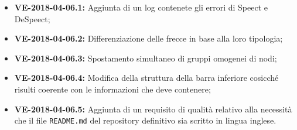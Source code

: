 \documentclass[openany,12pt,a4paper]{article}
\begin{document}
  \begin{itemize} 
      \item \textbf{VE-2018-04-06.1:} Aggiunta di un log contenete gli errori di Speect e DeSpeect; 
      \item \textbf{VE-2018-04-06.2:} Differenziazione delle frecce in base alla loro tipologia; 
      \item \textbf{VE-2018-04-06.3:} Spostamento simultaneo di gruppi omogenei di nodi; 
      \item \textbf{VE-2018-04-06.4:} Modifica della struttura della barra inferiore cosicché risulti coerente con le informazioni che deve contenere; 
      \item \textbf{VE-2018-04-06.5:} Aggiunta di un requisito di qualità relativo alla necessità che il file \verb|README.md| del repository definitivo sia scritto in lingua inglese.
  \end{itemize} 
   
  
\end{document}

